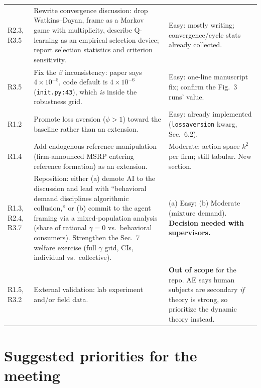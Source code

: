 \documentclass[11pt]{article}
\newcommand{\crit}[1]{\textcolor{crit}{\textbf{#1}}}
\newcommand{\med}[1]{\textcolor{med}{#1}}
\newcommand{\ok}[1]{\textcolor{ok}{#1}}
\begin{document}
\begin{longtable}{@{}p{}p{}p{}@{}}
R2.3, R3.5 &
Rewrite convergence discussion: drop Watkins--Dayan, frame as a Markov game with multiplicity, describe
Q-learning as an empirical selection device; report selection statistics and criterion sensitivity. &
\ok{Easy}: mostly writing; convergence/cycle stats already collected. \\

R3.5 &
Fix the $\beta$ inconsistency: paper says $4\times10^{-5}$, code default is $4\times10^{-6}$
(\texttt{init.py:43}), which \emph{is} inside the robustness grid. &
\ok{Easy}: one-line manuscript fix; confirm the Fig.~3 runs' value. \\

R1.2 &
Promote loss aversion ($\phi>1$) toward the baseline rather than an extension. &
\ok{Easy}: already implemented (\texttt{lossaversion} kwarg, Sec.~6.2). \\

R1.4 &
Add endogenous reference manipulation (firm-announced MSRP entering reference formation) as an extension. &
\med{Moderate}: action space $k^2$ per firm; still tabular. New section. \\

R1.3, R2.4, R3.7 &
Reposition: either (a) demote AI to the discussion and lead with ``behavioral demand disciplines
algorithmic collusion,'' or (b) commit to the agent framing via a mixed-population analysis (share of
rational $\gamma=0$ vs.\ behavioral consumers). Strengthen the Sec.~7 welfare exercise (full $\gamma$
grid, CIs, individual vs.\ collective). &
(a) \ok{Easy}; (b) \med{Moderate} (mixture demand). \textbf{Decision needed with supervisors.} \\

R1.5, R3.2 &
External validation: lab experiment and/or field data. &
\crit{Out of scope} for the repo. AE says human subjects are secondary \emph{if} theory is strong, so
prioritize the dynamic theory instead. \\
\bottomrule
\end{longtable}

\section{Suggested priorities for the meeting}
\end{document}
